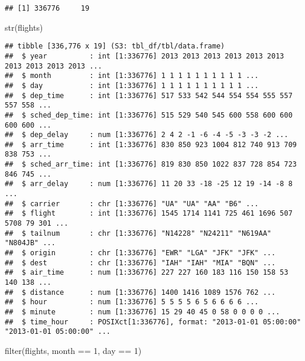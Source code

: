 \documentclass[
]{article}
\newenvironment{Shaded}{\begin{snugshade}}{\end{snugshade}}
\newcommand{\DecValTok}[1]{\textcolor[rgb]{0.00,0.00,0.81}{#1}}
\newcommand{\FunctionTok}[1]{\textcolor[rgb]{0.00,0.00,0.00}{#1}}
\newcommand{\NormalTok}[1]{#1}
\newcommand{\SpecialCharTok}[1]{\textcolor[rgb]{0.00,0.00,0.00}{#1}}
\begin{document}
\begin{verbatim}
## [1] 336776     19
\end{verbatim}

\begin{Shaded}
\begin{Highlighting}[]
\FunctionTok{str}\NormalTok{(flights)}
\end{Highlighting}
\end{Shaded}

\begin{verbatim}
## tibble [336,776 x 19] (S3: tbl_df/tbl/data.frame)
##  $ year          : int [1:336776] 2013 2013 2013 2013 2013 2013 2013 2013 2013 2013 ...
##  $ month         : int [1:336776] 1 1 1 1 1 1 1 1 1 1 ...
##  $ day           : int [1:336776] 1 1 1 1 1 1 1 1 1 1 ...
##  $ dep_time      : int [1:336776] 517 533 542 544 554 554 555 557 557 558 ...
##  $ sched_dep_time: int [1:336776] 515 529 540 545 600 558 600 600 600 600 ...
##  $ dep_delay     : num [1:336776] 2 4 2 -1 -6 -4 -5 -3 -3 -2 ...
##  $ arr_time      : int [1:336776] 830 850 923 1004 812 740 913 709 838 753 ...
##  $ sched_arr_time: int [1:336776] 819 830 850 1022 837 728 854 723 846 745 ...
##  $ arr_delay     : num [1:336776] 11 20 33 -18 -25 12 19 -14 -8 8 ...
##  $ carrier       : chr [1:336776] "UA" "UA" "AA" "B6" ...
##  $ flight        : int [1:336776] 1545 1714 1141 725 461 1696 507 5708 79 301 ...
##  $ tailnum       : chr [1:336776] "N14228" "N24211" "N619AA" "N804JB" ...
##  $ origin        : chr [1:336776] "EWR" "LGA" "JFK" "JFK" ...
##  $ dest          : chr [1:336776] "IAH" "IAH" "MIA" "BQN" ...
##  $ air_time      : num [1:336776] 227 227 160 183 116 150 158 53 140 138 ...
##  $ distance      : num [1:336776] 1400 1416 1089 1576 762 ...
##  $ hour          : num [1:336776] 5 5 5 5 6 5 6 6 6 6 ...
##  $ minute        : num [1:336776] 15 29 40 45 0 58 0 0 0 0 ...
##  $ time_hour     : POSIXct[1:336776], format: "2013-01-01 05:00:00" "2013-01-01 05:00:00" ...
\end{verbatim}

\begin{Shaded}
\begin{Highlighting}[]
\FunctionTok{filter}\NormalTok{(flights, month }\SpecialCharTok{==} \DecValTok{1}\NormalTok{, day }\SpecialCharTok{==} \DecValTok{1}\NormalTok{)}
\end{Highlighting}
\end{Shaded}
\end{document}
